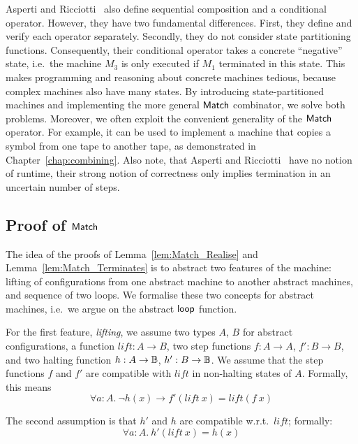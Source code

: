 Asperti and Ricciotti~\cite{asperti2015} also define sequential composition and a conditional operator.  However, they have two fundamental
differences.  First, they define and verify each operator separately.  Secondly, they do not consider state partitioning functions.  Consequently,
their conditional operator takes a concrete ``negative'' state, i.e.\ the machine $M_3$ is only executed if $M_1$ terminated in this state.  This
makes programming and reasoning about concrete machines tedious, because complex machines also have many states.  By introducing state-partitioned
machines and implementing the more general $\mathsf{Match}$ combinator, we solve both problems.  Moreover, we often exploit the convenient generality of the
$\mathsf{Match}$ operator.  For example, it can be used to implement a machine that copies a symbol from one tape to another tape, as demonstrated in
Chapter~\ref{chap:combining}.  Also note, that Asperti and Ricciotti~\cite{asperti2015} have no notion of runtime, their strong notion of correctness
only implies termination in an uncertain number of steps.


\subsection{Proof of $\mathsf{Match}$}
\label{sec:match-proofs}

The idea of the proofs of Lemma~\ref{lem:Match_Realise} and Lemma~\ref{lem:Match_Terminates} is to abstract two features of the machine: lifting of
configurations from one abstract machine to another abstract machines, and sequence of two loops.  We formalise these two concepts for abstract
machines, i.e.\ we argue on the abstract $\mathsf{loop}$ function.

For the first feature, \emph{lifting}, we assume two types $A$, $B$ for abstract configurations, a function $lift : A \to B$, two step functions
$f : A \to A$, $f' : B \to B$, and two halting function $h : A \rightarrow \mathbb{B}$, $h' : B \rightarrow \mathbb{B}$.  We assume that the step functions $f$ and $f'$ are
compatible with $lift$ in non-halting states of $A$.  Formally, this means
\begin{equation}
  \label{eq:loop_lift_assumption1}
  \forall a:A.~\lnot h(x) \rightarrow f' (lift~x) = lift (f~x)
\end{equation}

The second assumption is that $h'$ and $h$ are compatible w.r.t.\ $lift$; formally:
\begin{equation}
  \label{eq:loop_lift_assumption2}
  \forall a:A.~h'(lift~x)=h(x)
\end{equation}

